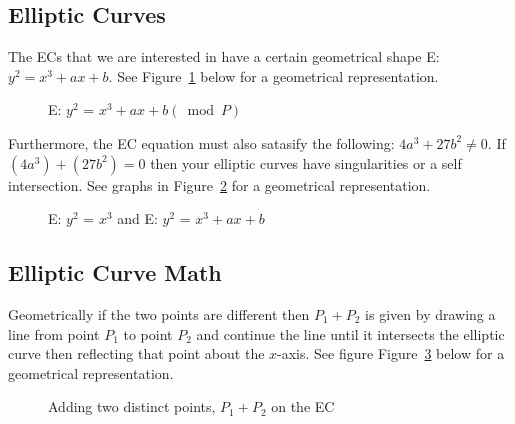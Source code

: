 \subsection{Elliptic Curves}
The  ECs that we are interested in have a certain geometrical shape E: $y^2 = x^3 + ax + b$.  See Figure~\ref{fig:DH:DHKE_5} below for a geometrical representation.  
\begin{figure}[H]
	  \caption{\label{fig:DH:DHKE_5}   E: $ y^2$ = $x^3+ax+b (\bmod P)$ }
\end{figure}
Furthermore, the EC equation must also satasify the following: $4a^3 + 27b^2 \neq 0$. If $(4a^3)+(27b^2) = 0$ then your elliptic curves have singularities or a self intersection.  See graphs in Figure~\ref{fig:DH:DHKE_10} for a geometrical representation.
\begin{figure}[H]
	  \caption{\label{fig:DH:DHKE_10} E: $ y^2$ = $x^3$ and E: $ y^2$ = $x^3+ax+b$ }
\end{figure}

\subsection{Elliptic Curve Math}
Geometrically if the two points are different then $P_1 + P_2$ is given by drawing a line from point $P_1$ to point $P_2$ and continue the line until it intersects the elliptic curve then reflecting that point about the $x$-axis.  See figure Figure~\ref{fig:DH:DHKE_6} below for a geometrical representation.
\begin{figure}[H]
	  \caption{\label{fig:DH:DHKE_6} Adding  two distinct points, $P_1 + P_2$ on the EC}
\end{figure}

